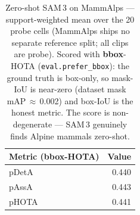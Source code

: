 \begin{table}[htbp]\centering
  \caption{Zero-shot SAM\,3 on MammAlps --- support-weighted mean over the 20 probe cells (MammAlps ships no
  separate reference split; all clips are probe). Scored with \textbf{bbox}-HOTA (\texttt{eval.prefer\_bbox}):
  the ground truth is box-only, so mask-IoU is near-zero (dataset mask mAP\,$\approx$\,0.002) and box-IoU is
  the honest metric. The score is non-degenerate --- SAM\,3 genuinely finds Alpine mammals zero-shot.}
  \label{tab:gate1_mammalps}
  \begin{tabular}{lr}
    \toprule
    Metric (bbox-HOTA) & Value \\
    \midrule
    pDetA & 0.440 \\
    pAssA & 0.443 \\
    pHOTA & 0.441 \\
    \bottomrule
  \end{tabular}
\end{table}
